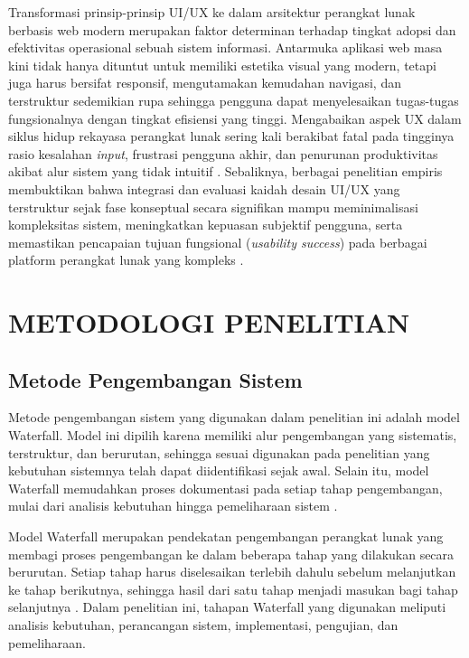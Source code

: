 \documentclass[12pt,a4paper,twoside]{report}
\begin{document}
Transformasi prinsip-prinsip UI/UX ke dalam arsitektur perangkat lunak berbasis web modern merupakan faktor determinan terhadap tingkat adopsi dan efektivitas operasional sebuah sistem informasi. Antarmuka aplikasi web masa kini tidak hanya dituntut untuk memiliki estetika visual yang modern, tetapi juga harus bersifat responsif, mengutamakan kemudahan navigasi, dan terstruktur sedemikian rupa sehingga pengguna dapat menyelesaikan tugas-tugas fungsionalnya dengan tingkat efisiensi yang tinggi. Mengabaikan aspek UX dalam siklus hidup rekayasa perangkat lunak sering kali berakibat fatal pada tingginya rasio kesalahan \textit{input}, frustrasi pengguna akhir, dan penurunan produktivitas akibat alur sistem yang tidak intuitif \cite{garrett2010}. Sebaliknya, berbagai penelitian empiris membuktikan bahwa integrasi dan evaluasi kaidah desain UI/UX yang terstruktur sejak fase konseptual secara signifikan mampu meminimalisasi kompleksitas sistem, meningkatkan kepuasan subjektif pengguna, serta memastikan pencapaian tujuan fungsional (\textit{usability success}) pada berbagai platform perangkat lunak yang kompleks \cite{lallemand2015}.

\newpage
\chapter{METODOLOGI PENELITIAN}

\section{Metode Pengembangan Sistem}

Metode pengembangan sistem yang digunakan dalam penelitian ini adalah model Waterfall. Model ini dipilih karena memiliki alur pengembangan yang sistematis, terstruktur, dan berurutan, sehingga sesuai digunakan pada penelitian yang kebutuhan sistemnya telah dapat diidentifikasi sejak awal. Selain itu, model Waterfall memudahkan proses dokumentasi pada setiap tahap pengembangan, mulai dari analisis kebutuhan hingga pemeliharaan sistem \cite{pressman2014}\cite{sommerville2016}.

Model Waterfall merupakan pendekatan pengembangan perangkat lunak yang membagi proses pengembangan ke dalam beberapa tahap yang dilakukan secara berurutan. Setiap tahap harus diselesaikan terlebih dahulu sebelum melanjutkan ke tahap berikutnya, sehingga hasil dari satu tahap menjadi masukan bagi tahap selanjutnya \cite{royce1970}\cite{pressman2014}. Dalam penelitian ini, tahapan Waterfall yang digunakan meliputi analisis kebutuhan, perancangan sistem, implementasi, pengujian, dan pemeliharaan.
\end{document}

